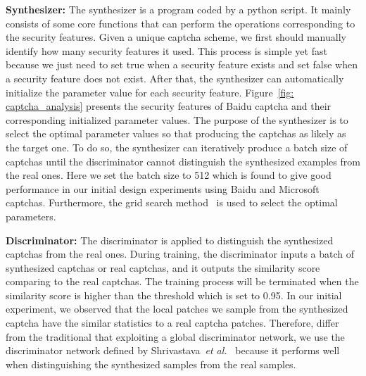 \noindent \textbf{Synthesizer:}
The synthesizer is a program coded by a python script. It mainly consists of some core functions that can perform the operations corresponding to the security features. Given a unique captcha scheme, we first should manually identify how many security features it used. This process is simple yet fast because we just need to set true when a security feature exists and set false when a security feature does not exist. After that, the synthesizer can automatically initialize the parameter value for each security feature. Figure~\ref{fig: captcha_analysis} presents the security features of Baidu captcha and their corresponding initialized parameter values. The purpose of the synthesizer is to select the optimal parameter values so that producing the captchas as likely as the target one. To do so, the synthesizer can iteratively produce a batch size of captchas until the discriminator cannot distinguish the synthesized examples from the real ones. Here we set the batch size to 512 which is found to give good performance in our initial design experiments using Baidu and Microsoft captchas. Furthermore, the grid search method~\cite{Audet2006Mesh} is used to select the optimal parameters.


\noindent \textbf{Discriminator:}
The discriminator is applied to distinguish the synthesized captchas from the real ones. During training, the discriminator inputs a batch of synthesized captchas or real captchas, and it outputs the similarity score comparing to the real captchas. The training process will be terminated when the similarity score is higher than the threshold which is set to 0.95. In our initial experiment, we observed that the local patches we sample from the synthesized captcha have the similar statistics to a real captcha patches. Therefore, differ from the traditional \GANs that exploiting a global discriminator network, we use the discriminator network defined by Shrivastava~\emph{et al.}~\cite{Shrivastava2016Learning} because it performs well when distinguishing the synthesized samples from the real samples.



